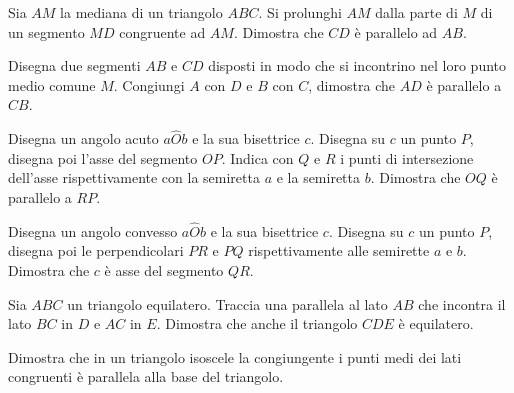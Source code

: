 \begin{multicols}{2}
\begin{esercizio}
\label{ese:3.38}
Sia $AM$ la mediana di un triangolo $ABC$. Si prolunghi $AM$ dalla 
parte di $M$ di un segmento $MD$ congruente ad $AM$. Dimostra che 
$CD$ è parallelo ad $AB$.
\end{esercizio}


\begin{esercizio}
\label{ese:3.42}
Disegna due segmenti $AB$ e $CD$ disposti in modo che si incontrino 
nel loro punto medio comune $M$. Congiungi $A$ con $D$ e $B$ con $C$, 
dimostra che $AD$ è parallelo a $CB$.
\end{esercizio}

\begin{esercizio}
\label{ese:3.43}
Disegna un angolo acuto $a\widehat{O}b$ e la sua bisettrice $c$. 
Disegna su $c$ un punto $P$, disegna poi l'asse del segmento $OP$. 
Indica con $Q$ e $R$ i punti di intersezione dell'asse 
rispettivamente con la semiretta $a$ e la semiretta $b$. Dimostra che 
$OQ$ è parallelo a $RP$.
\end{esercizio}

\begin{esercizio}
\label{ese:3.44}
Disegna un angolo convesso $a\widehat{O}b$ e la sua bisettrice $c$. 
Disegna su $c$ un punto $P$, disegna poi le perpendicolari $PR$ e 
$PQ$ rispettivamente alle semirette $a$ e $b$. Dimostra che $c$ è asse 
del segmento $QR$.
\end{esercizio}

\begin{esercizio}
\label{ese:3.45}
Sia $ABC$ un triangolo equilatero. Traccia una parallela al lato $AB$ 
che incontra il lato $BC$ in $D$ e $AC$ in $E$. Dimostra che anche il 
triangolo $CDE$ è equilatero.
\end{esercizio}

\begin{esercizio}
  \label{ese:3.66}
  Dimostra che in un triangolo isoscele la congiungente i punti medi 
  dei lati congruenti è parallela alla base del triangolo.
\end{esercizio}

\end{multicols}


